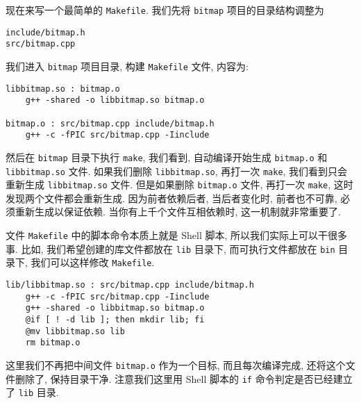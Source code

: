 \documentclass[a4paper]{ctexart}
\begin{document}
现在来写一个最简单的 \verb|Makefile|. 我们先将 \verb|bitmap| 项目的目录结构调整为
\begin{verbatim}
include/bitmap.h
src/bitmap.cpp
\end{verbatim}

我们进入 \verb|bitmap| 项目目录, 构建 \verb|Makefile| 文件, 内容为:
\begin{verbatim}
libbitmap.so : bitmap.o
	g++ -shared -o libbitmap.so bitmap.o

bitmap.o : src/bitmap.cpp include/bitmap.h
	g++ -c -fPIC src/bitmap.cpp -Iinclude 
\end{verbatim}
然后在 \verb|bitmap| 目录下执行 \verb|make|, 我们看到, 自动编译开始生成 \verb|bitmap.o|
和 \verb|libbitmap.so| 文件. 如果我们删除 \verb|libbitmap.so|, 再打一次 \verb|make|,
我们看到只会重新生成 \verb|libbitmap.so| 文件. 但是如果删除 \verb|bitmap.o| 文件, 再打一次
\verb|make|, 这时发现两个文件都会重新生成. 因为前者依赖后者, 当后者变化时, 前者也不可靠,
必须重新生成以保证依赖. 当你有上千个文件互相依赖时, 这一机制就非常重要了.

文件 \verb|Makefile| 中的脚本命令本质上就是 Shell 脚本, 所以我们实际上可以干很多事. 比如,
我们希望创建的库文件都放在 \verb|lib| 目录下, 而可执行文件都放在 \verb|bin| 目录下,
我们可以这样修改 \verb|Makefile|.
\begin{verbatim}
lib/libbitmap.so : src/bitmap.cpp include/bitmap.h 
	g++ -c -fPIC src/bitmap.cpp -Iinclude 
	g++ -shared -o libbitmap.so bitmap.o
	@if [ ! -d lib ]; then mkdir lib; fi
	@mv libbitmap.so lib
	rm bitmap.o
\end{verbatim}

这里我们不再把中间文件 \verb|bitmap.o| 作为一个目标, 而且每次编译完成,
还将这个文件删除了, 保持目录干净. 注意我们这里用 Shell 脚本的 \verb|if|
命令判定是否已经建立了 \verb|lib| 目录.
\end{document}
